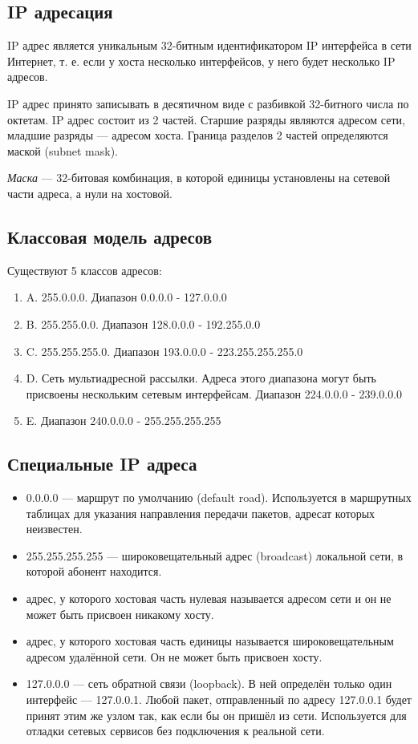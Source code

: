 \documentclass[12pt, russian, oneside, article]{ncc}
\begin{document}
\subsection{IP адресация}
\label{sec-6_1}


IP адрес является уникальным 32-битным идентификатором IP интерфейса в сети Интернет, т. е. если у хоста несколько интерфейсов, у него будет несколько IP адресов.

IP адрес принято записывать в десятичном виде с разбивкой 32-битного числа по октетам. IP адрес состоит из 2 частей. Старшие разряды являются адресом сети, младшие разряды --- адресом хоста. Граница разделов 2 частей определяются маской (subnet mask).

\emph{Маска} --- 32-битовая комбинация, в которой единицы установлены на сетевой части адреса, а нули на хостовой.
\subsection{Классовая модель адресов}
\label{sec-6_2}


Существуют 5 классов адресов:
\begin{enumerate}
\item A. 255.0.0.0. Диапазон 0.0.0.0 - 127.0.0.0
\item B. 255.255.0.0. Диапазон 128.0.0.0 - 192.255.0.0
\item C. 255.255.255.0. Диапазон 193.0.0.0 - 223.255.255.255.0
\item D. Сеть мультиадресной рассылки. Адреса этого диапазона могут быть присвоены нескольким сетевым интерфейсам. Диапазон 224.0.0.0 - 239.0.0.0
\item E. Диапазон 240.0.0.0 - 255.255.255.255
\end{enumerate}
\subsection{Специальные IP адреса}
\label{sec-6_3}


\begin{itemize}
\item 0.0.0.0 --- маршрут по умолчанию (default road). Используется в маршрутных таблицах для указания направления передачи пакетов, адресат которых неизвестен.
\item 255.255.255.255 --- широковещательный адрес (broadcast) локальной сети, в которой абонент находится.
\item адрес, у которого хостовая часть нулевая называется адресом сети и он не может быть присвоен никакому хосту.
\item адрес, у которого хостовая часть единицы называется широковещательным адресом удалённой сети. Он не может быть присвоен хосту.
\item 127.0.0.0 --- сеть обратной связи (loopback). В ней определён только один интерфейс --- 127.0.0.1. Любой пакет, отправленный по адресу 127.0.0.1 будет принят этим же узлом так, как если бы он пришёл из сети. Используется для отладки сетевых сервисов без подключения к реальной сети.
\end{itemize}
\end{document}
